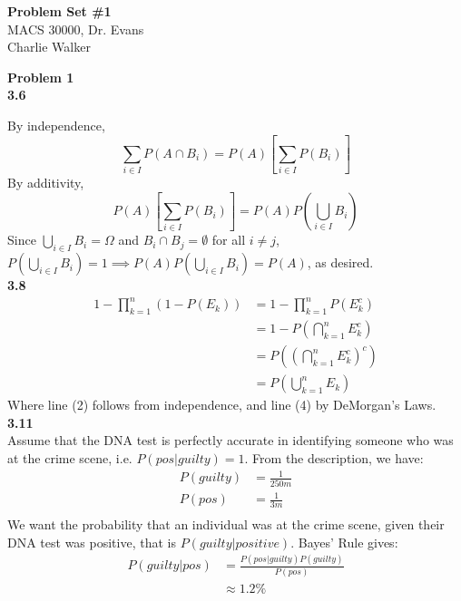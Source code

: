 \documentclass[letterpaper,12pt]{article}
\theoremstyle{definition}
\begin{document}
\begin{flushleft}
  \textbf{\large{Problem Set \#1}} \\
  MACS 30000, Dr. Evans \\
  Charlie Walker
\end{flushleft}
\vspace{5mm}
\noindent\textbf{Problem 1} \\

\noindent\textbf{3.6}

\noindent By independence,
\begin{equation*}
\sum_{i \in I}P(A \cap B_i) = P(A)[\sum_{i \in I}P(B_i)] 
\end{equation*}
By additivity,
\begin{equation*}
P(A)[\sum_{i \in I}P(B_i)] = P(A)P(\bigcup_{i \in I} B_i)
\end{equation*}
Since $\bigcup_{i \in I} B_i= \Omega$ and $B_i \cap B_j = \emptyset$ for all  $i \neq j$, $P(\bigcup_{i \in I} B_i) = 1 \implies P(A)P(\bigcup_{i \in I} B_i) = P(A)$, as desired.\newline\\
\noindent\textbf{3.8}\\
\noindent
\begin{equation*}
\begin{split}
1 - \prod^{n}_{k=1}(1 - P(E_k)) & = 1 - \prod^{n}_{k=1}P(E^{c}_{k}) \\
& = 1 - P(\bigcap^{n}_{k=1}E^{c}_{k})\\
& = P((\bigcap^{n}_{k=1}E^{c}_{k})^{c}) \\
& = P(\bigcup^{n}_{k=1}E_k) 
\end{split}
\end{equation*}
Where line (2) follows from independence, and line (4) by DeMorgan's Laws.\newline\\
\noindent\textbf{3.11}\\
\noindent Assume that the DNA test is perfectly accurate in identifying someone who was at the crime scene, i.e. $P(pos | guilty) = 1$. From the description, we have:
\begin{align*}
P(guilty) &= \frac{1}{250m} \\
P(pos) &= \frac{1}{3m} \\
\end{align*}
We want the probability that an individual was at the crime scene, given their DNA test was positive, that is $P(guilty | positive)$. Bayes' Rule gives:
\begin{equation*}
\begin{split}
P(guilty | pos) &= \frac{P(pos | guilty)P(guilty)}{P(pos)}\\
&\approx 1.2\%
\end{split}
\end{equation*}\newline\\
\end{document}
